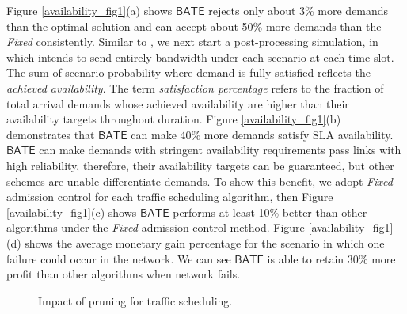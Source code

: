 \documentclass[sigconf]{acmart}
\begin{document}

Figure \ref{availability_fig1}(a)  shows $\mathsf{BATE}$  rejects only about 3\% more demands than the optimal solution and can accept about 50\% more demands than the \textit{Fixed} consistently.
Similar to \cite{Teavar}, we next start a post-processing simulation, in which intends to send entirely bandwidth under each scenario at each time slot.
The sum of scenario probability where demand is fully satisfied reflects the \textit{achieved availability}.
The term \textit{satisfaction percentage} refers to the fraction of total arrival demands whose achieved availability are higher than their availability targets throughout duration.
Figure \ref{availability_fig1}(b) demonstrates that $\mathsf{BATE}$ can make 40\% more demands satisfy SLA availability.
$\mathsf{BATE}$ can make demands with stringent availability requirements pass links with high reliability, therefore, their availability targets can be guaranteed, but other schemes are unable differentiate demands.
To show this benefit, we adopt \textit{Fixed} admission control for each traffic scheduling algorithm, then Figure \ref{availability_fig1}(c) shows $\mathsf{BATE}$ performs at least 10\% better than other algorithms under the \textit{Fixed} admission control method.
Figure \ref{availability_fig1}(d) shows the average monetary gain percentage for the scenario in which one failure could occur in the network.
We can see $\mathsf{BATE}$  is able to retain 30\% more profit than other algorithms when network fails.
\begin{figure}
\centering
{}
\caption{Impact of pruning for traffic scheduling.}
\label{availability_fig3}
\end{figure}
\end{document}
